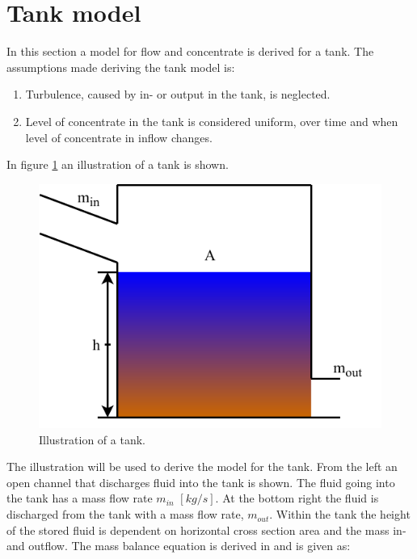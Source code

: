 \section{Tank model}\label{se:sewer_reservoir}
In this section a model for flow and concentrate is derived for a tank.%
The assumptions made deriving the tank model is:
\begin{table}[H]
\begin{enumerate}
\item Turbulence, caused by in- or output in the tank, is neglected.
\item Level of concentrate in the tank is considered uniform, over time and when level of concentrate in inflow changes. 
\end{enumerate}
\end{table}

In figure \ref{fig:tank_model} an illustration of a tank is shown.
\begin{figure}[H]
\centering
\includegraphics[width=.55\textwidth]{report/modeling/pictures/reservior.pdf}
\caption{Illustration of a tank.}
\label{fig:tank_model}
\end{figure} 

The illustration will be used to derive the model for the tank. From the left an open channel that discharges fluid into the tank is shown. The fluid going into the tank has a mass flow rate $m_{in}$ $\left[kg/s\right]$. At the bottom right the fluid is discharged from the tank with a mass flow rate, $m_{out}$. 
Within the tank the height of the stored fluid is dependent on horizontal cross section area and the mass in- and outflow.
The mass balance equation is derived in \cite{model_tank} and is given as:


